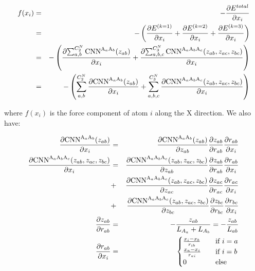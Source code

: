 \documentclass{article}
\begin{document}
\begin{eqnarray}
f(x_{i}) & = & -\frac{\partial{E^{total}}}{\partial{x_{i}}} \nonumber \\
& = & -\left(
	\frac{\partial{E^{(k=1)}}}{\partial{x_i}} 
	+ \frac{\partial{E^{(k=2)}}}{\partial{x_i}}
	+ \frac{\partial{E^{(k=3)}}}{\partial{x_i}} 
\right) \nonumber \\
& = & -\left(
\frac{
	\partial{\sum_{a,b}^{C^N_2}{
		\boldmath{\mathrm{CNN}}^{\mathrm{A}_{a}\mathrm{A}_{b}}}(z_{ab})}
	}{
		\partial{x_i}
	} 
+ 
\frac{
	\partial{\sum_{a,b,c}^{C^N_3}{
		\boldmath{\mathrm{CNN}}^{\mathrm{A}_{a}\mathrm{A}_{b}\mathrm{A}_{c}}}
		(z_{ab}, z_{ac}, z_{bc})}
	}{
		\partial{x_i}
	} 
\right) \nonumber \\
& = & -\left(
\sum_{a,b}^{C^N_2}{
	\frac{
		\partial{\boldmath{\mathrm{CNN}}^{\mathrm{A}_{a}\mathrm{A}_{b}}(z_{ab})}
	}{
		\partial{x_i}
	}
}
	+
\sum_{a,b,c}^{C^N_3}{
	\frac{
		\partial{\boldmath{\mathrm{CNN}}^{\mathrm{A}_{a}\mathrm{A}_{b}\mathrm{A}_{c}}
		(z_{ab}, z_{ac}, z_{bc})}
	}{
		\partial{x_i}
	}
}
\right)
\end{eqnarray}

\noindent where $f(x_{i})$ is the force component of atom $i$ along the X direction. We 
also have:

\begin{eqnarray}
\frac{
	\partial{\boldmath{\mathrm{CNN}}^{\mathrm{A}_{a}\mathrm{A}_{b}}(z_{ab})}
}{
	\partial{x_i}
} 
& = & 
\frac{\partial{
	\boldmath{\mathrm{CNN}}^{\mathrm{A}_{a}\mathrm{A}_{b}}(z_{ab})}
}{
	\partial{z_{ab}}
} \frac{\partial{z_{ab}}}{\partial{r_{ab}}} \frac{\partial{r_{ab}}}{\partial{x_i}} \\
\frac{
	\partial{\boldmath{\mathrm{CNN}}^{\mathrm{A}_{a}\mathrm{A}_{b}\mathrm{A}_{c}}
	(z_{ab}, z_{ac}, z_{bc})}
}{
	\partial{x_i}
} 
& = & 
\frac{\partial{
	\boldmath{\mathrm{CNN}}^{\mathrm{A}_{a}\mathrm{A}_{b}\mathrm{A}_{c}}
	(z_{ab}, z_{ac}, z_{bc})}
}{
	\partial{z_{ab}}
} \frac{\partial{z_{ab}}}{\partial{r_{ab}}}\frac{\partial{r_{ab}}}{\partial{x_i}} \nonumber \\
& + & 
\frac{\partial{
	\boldmath{\mathrm{CNN}}^{\mathrm{A}_{a}\mathrm{A}_{b}\mathrm{A}_{c}}
	(z_{ab}, z_{ac}, z_{bc})}
}{
	\partial{z_{ac}}
} \frac{\partial{z_{ac}}}{\partial{r_{ac}}}\frac{\partial{r_{ac}}}{\partial{x_i}} \nonumber \\
& + &
\frac{\partial{
	\boldmath{\mathrm{CNN}}^{\mathrm{A}_{a}\mathrm{A}_{b}\mathrm{A}_{c}}
	(z_{ab}, z_{ac}, z_{bc})}
}{
	\partial{z_{bc}}
} \frac{\partial{z_{bc}}}{\partial{r_{bc}}}\frac{\partial{r_{bc}}}{\partial{x_i}} \\
\frac{ \partial{z_{ab}}}{\partial{r_{ab}}} 
& = & 
-\frac{z_{ab}}{L_{A_a} + L_{A_b}} = -\frac{z_{ab}}{L_{ab}} \\
\frac{\partial{r_{ab}}}{\partial{x_i}} & = & \begin{cases}
	\frac{x_i - x_b}{r_{ib}} & \quad \text{if } i = a \\
	\frac{x_a - x_i}{r_{ai}} & \quad \text{if } i = b \\
	0                        & \quad \text{else}
\end{cases} 
\end{eqnarray}
\end{document}
